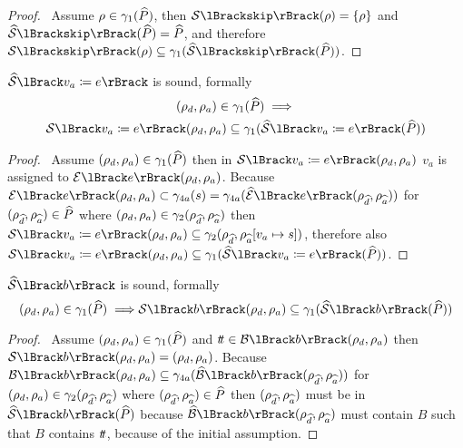 \begin{proof}
    \pf\ Assume $\rho \in \gamma_1(\widehat{P})$, then $\sem{\texttt{skip}}(\rho) = \{\rho\}$ and $\abssem{\texttt{skip}}(\ab{P}) = \ab{P}$, and therefore $\sem{\texttt{skip}}(\rho) \subseteq \concrete_1(\abssem{\texttt{skip}}(\ab{P}))$.
\end{proof}


\begin{conjecture}
    \label{thm:sound-assign}
    $\abssem{v_a \coloneqq e}$ is sound, formally
    \begin{multline*}
    (\rho_d, \rho_a)
        \in \concrete_1(\ab{P}) \implies \\
        \sem{v_a \coloneqq e}(\rho_d, \rho_a) \subseteq \concrete_1(\abssem{v_a \coloneqq e}(\ab{P}))
    \end{multline*}
\end{conjecture}


\begin{proof}
    \pf\
    Assume $(\rho_{d}, \rho_{a}) \in \gamma_1(\widehat{P})$ then in $\sem{v_a \coloneqq e}(\env{d}, \env{a})$ $v_a$ is assigned to $\expsem{e}(\env{d}, \env{a})$.
    Because $\expsem{e}(\env{d}, \env{a}) \subset \concrete_{4a}(s) = \concrete_{4a}(\absexpsem{e}(\env{\ab{d}}, \env{\ab{a}}))$ for $(\rho_{\widehat{d}}, \rho_{\widehat{a}}) \in \widehat{P}$ where $(\rho_{d}, \rho_{a}) \in \gamma_2(\rho_{\widehat{d}}, \rho_{\widehat{a}})$ then $\sem{v_a \coloneqq e}(\env{d}, \env{a}) \subseteq \concrete_2(\env{\ab{d}}, \env{\ab{a}}[v_a \mapsto s])$, therefore also $\sem{v_a \coloneqq e}(\env{d}, \env{a}) \subseteq \concrete_1(\abssem{v_a \coloneqq e}(\ab{P}))$.
\end{proof}


\begin{conjecture}
    \label{thm:sound-boolsem}
    $\abssem{b}$ is sound, formally
    \begin{equation*}
    (\rho_d, \rho_a)
        \in \concrete_1(\ab{P}) \implies \\
        \sem{b}(\rho_d, \rho_a) \subseteq \concrete_1(\abssem{b}(\ab{P}))
    \end{equation*}
\end{conjecture}


\begin{proof}
    \pf\
    Assume $(\rho_{d}, \rho_{a}) \in \gamma_1(\widehat{P})$ and $\true \in \boolsem{b}(\env{d}, \env{a})$ then $\sem{b}(\env{d}, \env{a}) = (\env{d}, \env{a})$.
    Because $\boolsem{b}(\env{d}, \env{a}) \subseteq \concrete_{4a}(\absboolsem{b}(\env{\ab{d}}, \env{\ab{a}}))$ for $(\rho_{d}, \rho_{a}) \in \gamma_2(\rho_{\widehat{d}}, \rho_{\widehat{a}})$ where $(\rho_{\widehat{d}}, \rho_{\widehat{a}}) \in \widehat{P}$ then $(\rho_{\widehat{d}}, \rho_{\widehat{a}})$ must be in $\abssem{b}(\ab{P})$ because $\absboolsem{b}(\env{\ab{d}}, \env{\ab{a}})$ must contain $B$ such that $B$ contains $t\!t$, because of the initial assumption.
\end{proof}


